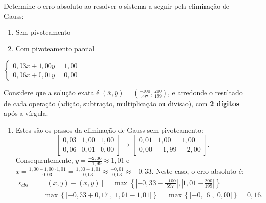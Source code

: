 \documentclass[12pt,a4paper]{article}
\begin{document}
\begin{ExerciseList}
\Exercise[title={2,5}]
Determine o erro absoluto ao resolver o sistema a seguir pela eliminação de Gauss:
\begin{multicols}{2}
\begin{enumerate}
\item Sem pivoteamento
\item Com pivoteamento parcial
\end{enumerate}
$\begin{cases}
0,03x+1,00y=1,00\\
0,06x+0,01y=0,00
\end{cases}$
\end{multicols}
Considere que a solução exata é $(\overline{x},\overline{y}) = (\frac{-100}{597}, \frac{200}{199})$, e arredonde o resultado de cada operação (adição, subtração, multiplicação ou divisão), com \textbf{2 dígitos} após a vírgula.
\Answer
\begin{enumerate}
\item Estes são os passos da eliminação de Gauss sem pivoteamento:
\[
\begin{bmatrix}
0,03 & 1,00 & 1,00\\
0,06 & 0,01 & 0,00
\end{bmatrix}
\rightarrow
\begin{bmatrix}
0,01 &  1,00 &  1,00\\
0,00 & -1,99 & -2,00
\end{bmatrix}.
\]
Consequentemente, $y = \frac{-2,00}{-1,99} \approx 1,01$ e
$x = \frac{1,00 - 1,00 \cdot 1,01}{0,03}
= \frac{1,00 - 1,01}{0,03}
\approx \frac{-0,01}{0,03}\approx -0,33$. Neste caso, o erro absoluto é:
\begin{align*}
\varepsilon_{abs}
& = ||(x,y) - (\overline{x},\overline{y})||
  = \max \left\{ \left|-0,33 - \frac{-100}{597}\right|, \left|1,01 - \frac{200}{199}\right| \right\}\\
& = \max \left\{ \left|-0,33 + 0,17\right|, \left|1,01 - 1,01\right| \right\} 
  = \max \left\{ \left|-0,16\right|, \left|0,00\right| \right\}
  = 0,16.
\end{align*}


\end{enumerate}
\end{ExerciseList}
\end{document}
